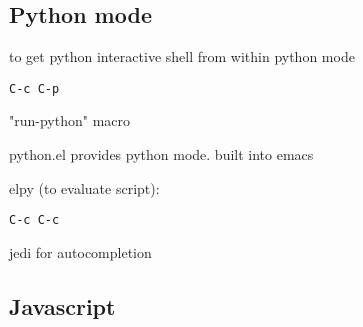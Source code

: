 \subsection{Python mode}

to get python interactive shell from within python mode

\begin{verbatim}
C-c C-p
\end{verbatim}

"run-python" macro

python.el provides python mode. built into emacs

elpy (to evaluate script):
\begin{verbatim}
C-c C-c
\end{verbatim}

jedi for autocompletion


\subsection{Javascript}
